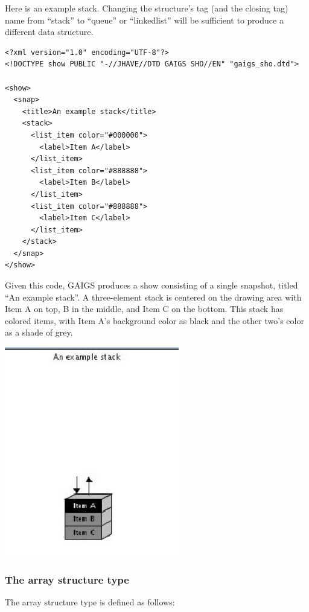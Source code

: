 \documentclass[12pt]{article}
\begin{document}
Here is an example stack. Changing the structure's tag (and the
closing tag) name from ``stack'' to ``queue'' or ``linkedlist'' will
be sufficient to produce a different data structure.

\footnotesize \begin{verbatim}
<?xml version="1.0" encoding="UTF-8"?>
<!DOCTYPE show PUBLIC "-//JHAVE//DTD GAIGS SHO//EN" "gaigs_sho.dtd">

<show>
  <snap>
    <title>An example stack</title>
    <stack>
      <list_item color="#000000">
        <label>Item A</label>
      </list_item>
      <list_item color="#888888">
        <label>Item B</label>
      </list_item>
      <list_item color="#888888">
        <label>Item C</label>
      </list_item>
    </stack>
  </snap>
</show> 
\end{verbatim} \normalsize

Given this code, GAIGS produces a show consisting of a single
snapshot, titled ``An example stack''. A three-element stack is
centered on the drawing area with Item A on top, B in the middle, and
Item C on the bottom. This stack has colored items, with Item A's
background color as black and the other two's color as a shade of
grey.


\begin{center}
  \includegraphics[width=3in]{howto_graphics/stack.eps}
\end{center}


\subsubsection{The array structure type}


The array structure type is defined as follows:
\end{document}
